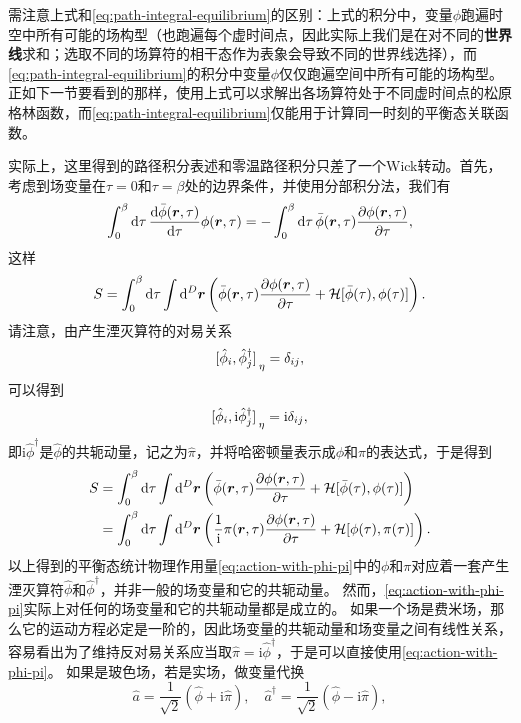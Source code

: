 \documentclass[hyperref, UTF8, a4paper]{ctexart}
\newcommand*{\ii}{\mathrm{i}}
\begin{document}
需注意上式和\eqref{eq:path-integral-equilibrium}的区别：上式的积分中，变量$\phi$跑遍时空中所有可能的场构型（也跑遍每个虚时间点，因此实际上我们是在对不同的\textbf{世界线}求和；选取不同的场算符的相干态作为表象会导致不同的世界线选择），而\eqref{eq:path-integral-equilibrium}的积分中变量$\phi$仅仅跑遍空间中所有可能的场构型。
正如下一节要看到的那样，使用上式可以求解出各场算符处于不同虚时间点的松原格林函数，而\eqref{eq:path-integral-equilibrium}仅能用于计算同一时刻的平衡态关联函数。

实际上，这里得到的路径积分表述和零温路径积分只差了一个Wick转动。首先，考虑到场变量在$\tau=0$和$\tau=\beta$处的边界条件，并使用分部积分法，我们有
\[
    \int_0^\beta \dd{\tau} \dv{\bar{\phi}(\vb*{r}, \tau)}{\tau} \phi(\vb*{r}, \tau) = - \int_0^\beta \dd{\tau} \bar{\phi}(\vb*{r}, \tau) \pdv{\phi(\vb*{r}, \tau)}{\tau},
\]
这样
\[
    S = \int_0^\beta \dd{\tau} \int \dd[D]{\vb*{r}} \left( \bar{\phi}(\vb*{r}, \tau) \pdv{\phi(\vb*{r}, \tau)}{\tau} + \mathcal{H}[\bar{\phi}(\tau), \phi(\tau)] \right).
\]
请注意，由产生湮灭算符的对易关系
\[
    \comm*{\hat{\phi}_i}{\hat{\phi}_j^\dagger}_\eta = \delta_{ij},
\]
可以得到
\[
    \comm*{\hat{\phi}_i}{\ii \hat{\phi}_j^\dagger}_\eta = \ii \delta_{ij},
\]
即$\ii \hat{\phi}^\dagger$是$\hat{\phi}$的共轭动量，记之为$\hat{\pi}$，并将哈密顿量表示成$\phi$和$\pi$的表达式，于是得到
\begin{equation}
    \begin{aligned}
        S &= \int_0^\beta \dd{\tau} \int \dd[D]{\vb*{r}} \left( \bar{\phi}(\vb*{r}, \tau) \pdv{\phi(\vb*{r}, \tau)}{\tau} + \mathcal{H}[\bar{\phi}(\tau), \phi(\tau)] \right) \\
        &= \int_0^\beta \dd{\tau} \int \dd[D]{\vb*{r}} \left( \frac{1}{\ii} \pi(\vb*{r}, \tau) \pdv{\phi(\vb*{r}, \tau)}{\tau} + \mathcal{H}[\phi(\tau), \pi(\tau)] \right).
    \end{aligned}
    \label{eq:action-with-phi-pi}
\end{equation}
以上得到的平衡态统计物理作用量\eqref{eq:action-with-phi-pi}中的$\phi$和$\pi$对应着一套产生湮灭算符$\hat{\phi}$和$\hat{\phi}^\dagger$，并非一般的场变量和它的共轭动量。
然而，\eqref{eq:action-with-phi-pi}实际上对任何的场变量和它的共轭动量都是成立的。
如果一个场是费米场，那么它的运动方程必定是一阶的，因此场变量的共轭动量和场变量之间有线性关系，容易看出为了维持反对易关系应当取$\hat{\pi} = \ii \hat{\phi}^\dagger$，于是可以直接使用\eqref{eq:action-with-phi-pi}。
如果是玻色场，若是实场，做变量代换
\[
    \hat{a} = \frac{1}{\sqrt{2}} (\hat{\phi} + \ii \hat{\pi}), \quad \hat{a}^\dagger = \frac{1}{\sqrt{2}} (\hat{\phi} - \ii \hat{\pi}),
\]
\end{document}
